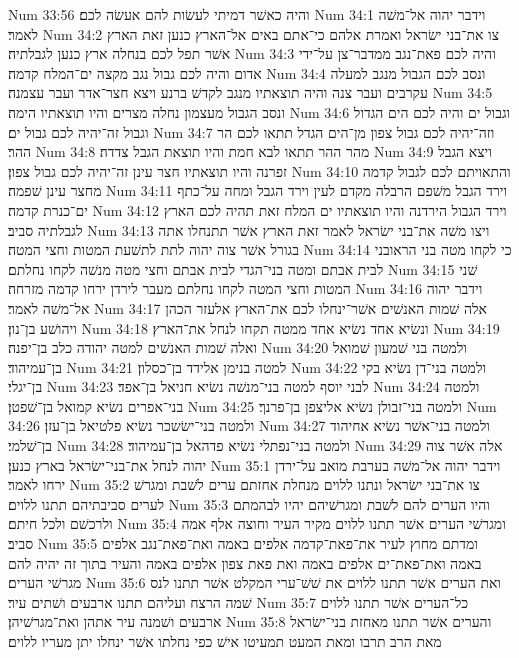 Num 33:56  והיה כאשׁר דמיתי לעשׂות להם אעשׂה לכם׃
Num 34:1  וידבר יהוה אל־משׁה לאמר׃
Num 34:2  צו את־בני ישׂראל ואמרת אלהם כי־אתם באים אל־הארץ כנען זאת הארץ אשׁר תפל לכם בנחלה ארץ כנען לגבלתיה׃
Num 34:3  והיה לכם פאת־נגב ממדבר־צן על־ידי אדום והיה לכם גבול נגב מקצה ים־המלח קדמה׃
Num 34:4  ונסב לכם הגבול מנגב למעלה עקרבים ועבר צנה והיה תוצאתיו מנגב לקדשׁ ברנע ויצא חצר־אדר ועבר עצמנה׃
Num 34:5  ונסב הגבול מעצמון נחלה מצרים והיו תוצאתיו הימה׃
Num 34:6  וגבול ים והיה לכם הים הגדול וגבול זה־יהיה לכם גבול ים׃
Num 34:7  וזה־יהיה לכם גבול צפון מן־הים הגדל תתאו לכם הר ההר׃
Num 34:8  מהר ההר תתאו לבא חמת והיו תוצאת הגבל צדדה׃
Num 34:9  ויצא הגבל זפרנה והיו תוצאתיו חצר עינן זה־יהיה לכם גבול צפון׃
Num 34:10  והתאויתם לכם לגבול קדמה מחצר עינן שׁפמה׃
Num 34:11  וירד הגבל משׁפם הרבלה מקדם לעין וירד הגבל ומחה על־כתף ים־כנרת קדמה׃
Num 34:12  וירד הגבול הירדנה והיו תוצאתיו ים המלח זאת תהיה לכם הארץ לגבלתיה סביב׃
Num 34:13  ויצו משׁה את־בני ישׂראל לאמר זאת הארץ אשׁר תתנחלו אתה בגורל אשׁר צוה יהוה לתת לתשׁעת המטות וחצי המטה׃
Num 34:14  כי לקחו מטה בני הראובני לבית אבתם ומטה בני־הגדי לבית אבתם וחצי מטה מנשׁה לקחו נחלתם׃
Num 34:15  שׁני המטות וחצי המטה לקחו נחלתם מעבר לירדן ירחו קדמה מזרחה׃
Num 34:16  וידבר יהוה אל־משׁה לאמר׃
Num 34:17  אלה שׁמות האנשׁים אשׁר־ינחלו לכם את־הארץ אלעזר הכהן ויהושׁע בן־נון׃
Num 34:18  ונשׂיא אחד נשׂיא אחד ממטה תקחו לנחל את־הארץ׃
Num 34:19  ואלה שׁמות האנשׁים למטה יהודה כלב בן־יפנה׃
Num 34:20  ולמטה בני שׁמעון שׁמואל בן־עמיהוד׃
Num 34:21  למטה בנימן אלידד בן־כסלון׃
Num 34:22  ולמטה בני־דן נשׂיא בקי בן־יגלי׃
Num 34:23  לבני יוסף למטה בני־מנשׁה נשׂיא חניאל בן־אפד׃
Num 34:24  ולמטה בני־אפרים נשׂיא קמואל בן־שׁפטן׃
Num 34:25  ולמטה בני־זבולן נשׂיא אליצפן בן־פרנך׃
Num 34:26  ולמטה בני־ישׂשכר נשׂיא פלטיאל בן־עזן׃
Num 34:27  ולמטה בני־אשׁר נשׂיא אחיהוד בן־שׁלמי׃
Num 34:28  ולמטה בני־נפתלי נשׂיא פדהאל בן־עמיהוד׃
Num 34:29  אלה אשׁר צוה יהוה לנחל את־בני־ישׂראל בארץ כנען׃
Num 35:1  וידבר יהוה אל־משׁה בערבת מואב על־ירדן ירחו לאמר׃
Num 35:2  צו את־בני ישׂראל ונתנו ללוים מנחלת אחזתם ערים לשׁבת ומגרשׁ לערים סביבתיהם תתנו ללוים׃
Num 35:3  והיו הערים להם לשׁבת ומגרשׁיהם יהיו לבהמתם ולרכשׁם ולכל חיתם׃
Num 35:4  ומגרשׁי הערים אשׁר תתנו ללוים מקיר העיר וחוצה אלף אמה סביב׃
Num 35:5  ומדתם מחוץ לעיר את־פאת־קדמה אלפים באמה ואת־פאת־נגב אלפים באמה ואת־פאת־ים אלפים באמה ואת פאת צפון אלפים באמה והעיר בתוך זה יהיה להם מגרשׁי הערים׃
Num 35:6  ואת הערים אשׁר תתנו ללוים את שׁשׁ־ערי המקלט אשׁר תתנו לנס שׁמה הרצח ועליהם תתנו ארבעים ושׁתים עיר׃
Num 35:7  כל־הערים אשׁר תתנו ללוים ארבעים ושׁמנה עיר אתהן ואת־מגרשׁיהן׃
Num 35:8  והערים אשׁר תתנו מאחזת בני־ישׂראל מאת הרב תרבו ומאת המעט תמעיטו אישׁ כפי נחלתו אשׁר ינחלו יתן מעריו ללוים׃
